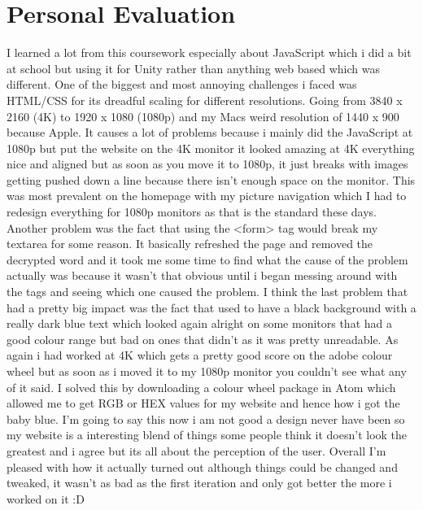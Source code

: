 \documentclass[10pt, a4paper]{article}
\begin{document}
\section{Personal Evaluation}
I learned a lot from this coursework especially about JavaScript which i did a bit at school but using it for Unity rather than anything web based which was different. One of the biggest and most annoying challenges i faced was HTML/CSS for its dreadful scaling for different resolutions. Going from 3840 x 2160 (4K) to 1920 x 1080 (1080p) and my Macs weird resolution of 1440 x 900 because Apple. It causes a lot of problems because i mainly did the JavaScript at 1080p but put the website on the 4K monitor it looked amazing at 4K everything nice and aligned but as soon as you move it to 1080p, it just breaks with images getting pushed down a line because there isn't enough space on the monitor. This was most prevalent on the homepage with my picture navigation which I had to redesign everything for 1080p monitors as that is the standard these days. Another problem was the fact that using the <form> tag would break my textarea for some reason. It basically refreshed the page and removed the decrypted word and it took me some time to find what the cause of the problem actually was because it wasn't that obvious until i began messing around with the tags and seeing which one caused the problem. I think the last problem that had a pretty big impact was the fact that used to have a black background with a really dark blue text which looked again alright on some monitors that had a good colour range but bad on ones that didn't as it was pretty unreadable. As again i had worked at 4K which gets a pretty good score on the adobe colour wheel but as soon as i moved it to my 1080p monitor you couldn't see what any of it said. I solved this by downloading a colour wheel package in Atom which allowed me to get RGB or HEX values for my website and hence how i got the baby blue. I'm going to say this now i am not good a design never have been so my website is a interesting blend of things some people think it doesn't look the greatest and i agree but its all about the perception of the user. Overall I'm pleased with how it actually turned out although things could be changed and tweaked, it wasn't as bad as the first iteration and only got better the more i worked on it :D 
\end{document}
